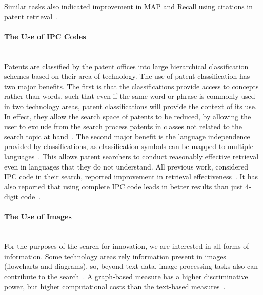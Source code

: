 Similar tasks also indicated improvement in MAP and Recall using citations in patent retrieval~\citep{gobeill2010simple, gurulingappa2010prior}. 
\paragraph{The Use of IPC Codes}
\ \\
Patents are classified by the patent offices into large hierarchical classification schemes based on their area of technology. The use of patent
classification has two major benefits. The first is that the classifications provide access to concepts rather than words, such that even
if the same word or phrase is commonly used in two technology areas, patent classifications will provide the context of its use. In effect, they
allow the search space of patents to be reduced, by allowing the user to exclude from the search process patents in classes not related to
the search topic at hand~\citep{lopez2010patatras}. The second major benefit is the language independence provided by classifications, as classification symbols can be mapped to multiple languages~\citep{DBLP:conf/clef/DhondtV10}. This allows patent searchers to conduct reasonably effective retrieval even in languages that they do not understand. All previous work, considered IPC code in their search, reported improvement in retrieval effectiveness~\citep{harris2010comparison, harris2011using, harris2009role, fujita2005revisiting, graf2010knowledge, herbert2010prior, kang2007cluster, verma2011applying}. It has also reported that using complete IPC code leads in better results than just 4-digit code~\citep{ gobeill2010simple}.
\paragraph{The Use of Images}
\ \\
For the purposes of the search for innovation, we are interested in all forms of information. Some technology areas rely information present in images (flowcharts and diagrams), so, beyond text data, image processing tasks also can contribute to the search~\citep{lupu2013patent}. A graph-based measure has a higher discriminative power, but higher computational costs than the text-based measures~\citep{lupu2013evaluating}.
